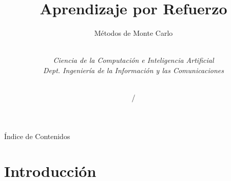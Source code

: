 \documentclass[10pt, envcountsect, handout, aspectratio=1610, hyperref={hypertexnames=true}]{beamer}
\title[Aprendizaje por Refuerzo]{Aprendizaje por Refuerzo}
\subtitle{Métodos de Monte Carlo} %
\author[L. D. Hernández] %
{%
	\sc{Luis Daniel Hernández Molinero }\\ %
	\textit{Ciencia de la Computación e Inteligencia Artificial}\\  %
	\textit{Dept. Ingeniería de la Información y las Comunicaciones}\\  %
	\\   %
}
\institute[DIIC]%
{
	\textit{Universidad de Murcia}
}
\date{\arabic{lastyear} / \the\year} %
\begin{document}
	











\begin{frame}[plain]
	\titlepage
\end{frame}


\begin{frame}{Índice de Contenidos}
	\tableofcontents 
	

\end{frame}







\section{Introducción}

\end{document}
